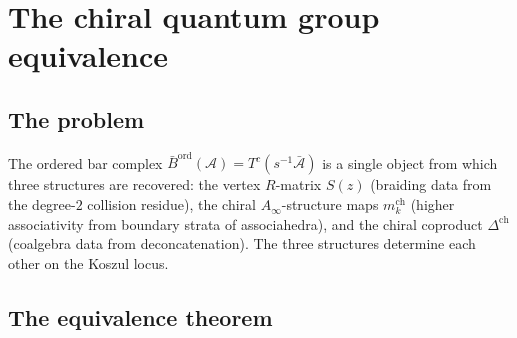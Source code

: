 \documentclass[11pt,reqno]{amsart}
\theoremstyle{definition}
\theoremstyle{remark}
\providecommand{\cA}{\mathcal{A}}
\providecommand{\Ainf}{A_\infty}
\providecommand{\Barord}{\bar{B}^{\mathrm{ord}}}
\begin{document}

\section{The chiral quantum group equivalence}
\label{sec:chiral-qg}

\subsection{The problem}

The ordered bar complex
$\Barord(\cA) = T^c(s^{-1}\bar{\cA})$
is a single object from which three structures are recovered:
the vertex $R$-matrix $S(z)$ (braiding data from the
degree-$2$ collision residue), the chiral $\Ainf$-structure
maps $m_k^{\mathrm{ch}}$ (higher associativity from boundary
strata of associahedra), and the chiral coproduct
$\Delta^{\mathrm{ch}}$ (coalgebra data from deconcatenation).
The three structures determine each other on the Koszul locus.

\subsection{The equivalence theorem}
\end{document}
